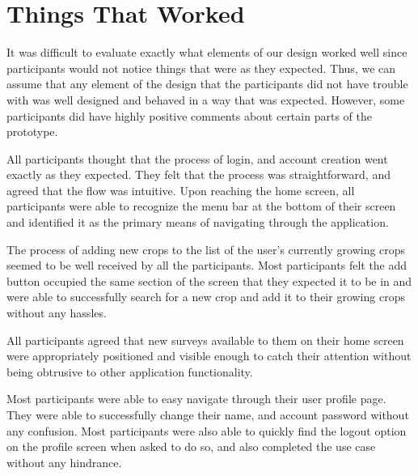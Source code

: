 \documentclass[12pt,letterpaper]{article}
\begin{document}
\clearpage
\section{Things That Worked}
It was difficult to evaluate exactly what elements of our design worked well since participants would not notice things that were as they expected. Thus, we can assume that any element of the design that the participants did not have trouble with was well designed and behaved in a way that was expected. However, some participants did have highly positive comments about certain parts of the prototype.\par
All participants thought that the process of login, and account creation went exactly as they expected. They felt that the process was straightforward, and agreed that the flow was intuitive. Upon reaching the home screen, all participants were able to recognize the menu bar at the bottom of their screen and identified it as the primary means of navigating through the application.\par
The process of adding new crops to the list of the user's currently growing crops seemed to be well received by all the participants. Most participants felt the add button occupied the same section of the screen that they expected it to be in and were able to successfully search for a new crop and add it to their growing crops without any hassles.\par
All participants agreed that new surveys available to them on their home screen were appropriately positioned and visible enough to catch their attention without being obtrusive to other application functionality.\par
Most participants were able to easy navigate through their user profile page. They were able to successfully change their name, and account password without any confusion. Most participants were also able to quickly find the logout option on the profile screen when asked to do so, and also completed the use case without any hindrance.

\clearpage
\end{document}
